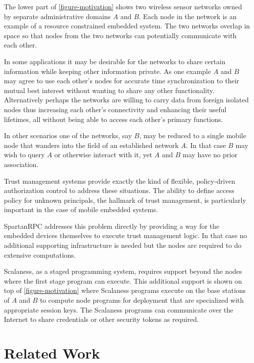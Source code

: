 The lower part of \autoref{figure-motivation} shows two wireless sensor networks owned by
separate administrative domains $A$ and $B$. Each node in the network is an example of a
resource constrained embedded system. The two networks overlap in space so that nodes from the
two networks can potentially communicate with each other.

In some applications it may be desirable for the networks to share certain information while
keeping other information private. As one example $A$ and $B$ may agree to use each other's
nodes for accurate time synchronization to their mutual best interest without wanting to share
any other functionality. Alternatively perhaps the networks are willing to carry data from
foreign isolated nodes thus increasing each other's connectivity and enhancing their useful
lifetimes, all without being able to access each other's primary functions.

In other scenarios one of the networks, say $B$, may be reduced to a single mobile node that
wanders into the field of an established network $A$. In that case $B$ may wish to query $A$ or
otherwise interact with it, yet $A$ and $B$ may have no prior association.

Trust management systems provide exactly the kind of flexible, policy-driven authorization
control to address these situations. The ability to define access policy for unknown principals,
the hallmark of trust management, is particularly important in the case of mobile embedded
systems.

SpartanRPC addresses this problem directly by providing a way for the embedded devices
themselves to execute trust management logic. In that case no additional supporting
infrastructure is needed but the nodes are required to do extensive computations.

Scalaness, as a staged programming system, requires support beyond the nodes where the first
stage program can execute. This additional support is shown on top of
\autoref{figure-motivation} where Scalaness programs execute on the base stations of $A$ and $B$
to compute node programs for deployment that are specialized with appropriate session keys. The
Scalaness programs can communicate over the Internet to share credentials or other security
tokens as required.

\section{Related Work}


